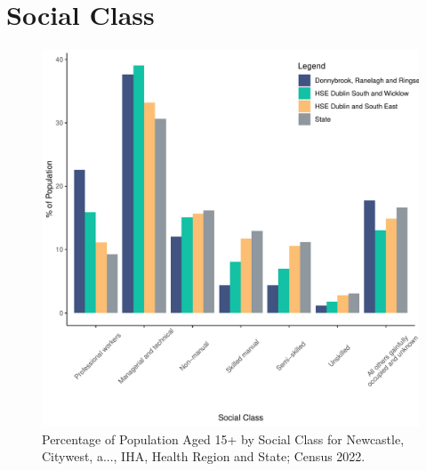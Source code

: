 \documentclass{article}
\begin{document}
\section{Social Class}\label{sect:SC}
\begin{figure}[H]
	\centering
	\includegraphics[width = 140mm]{../figures/SocialClassED.pdf}
	\caption{Percentage of Population Aged 15+ by Social Class for Newcastle, Citywest, a..., IHA, Health Region and State; Census 2022.}
	\label{fig:vbnv}
	\end{figure}
\end{document}

